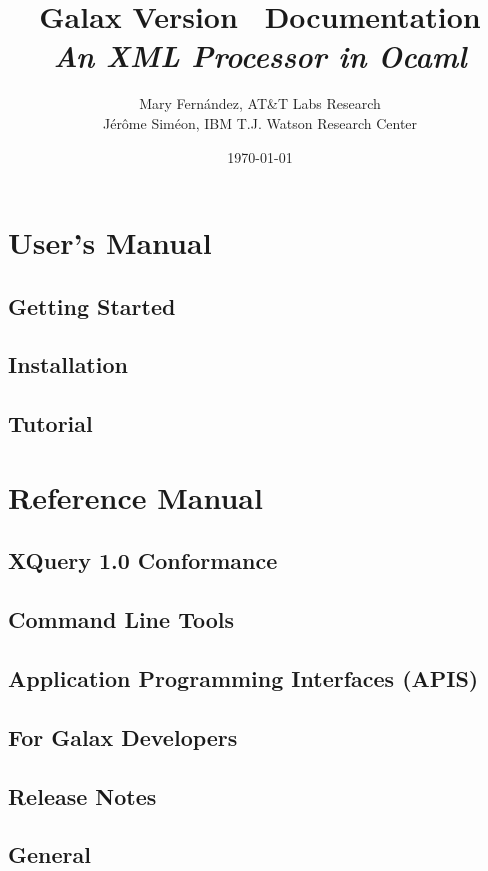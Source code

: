 \documentclass{book}[11pt]
\title{\Large\bf {\LARGE Galax Version \galaxversion\ Documentation}\\[0.5cm] \textit{An XML Processor in Ocaml}}
\author{Mary Fern\'andez, AT\&T Labs Research \\ J\'er\^ome Sim\'eon, IBM T.J. Watson Research Center}
\date{\today}
\newcommand{\eat}[1]{}
\begin{document}
\maketitle

\tableofcontents

\part{User's Manual}
\chapter{Getting Started}
\label{sec:readme}


\chapter{Installation}
\label{sec:install}


\chapter{Tutorial}
\label{sec:tutorial}


\part{Reference Manual}

\chapter{XQuery 1.0 Conformance}
\label{sec:alignment}


\chapter{Command Line Tools}
\label{sec:commandline}


\chapter{Application Programming Interfaces (APIS)}
\label{sec:api}


\eat{
\chapter{Accessing and Storing XML}
\label{sec:documents}
\cutname{documents.html}

}

\chapter{For Galax Developers}
\label{sec:developers}


\chapter{Release Notes}
\label{sec:releasenotes}


\chapter{General}
\label{sec:general}

\end{document}
